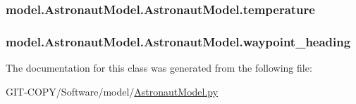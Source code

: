 \subsubsection[{temperature}]{\setlength{\rightskip}{0pt plus 5cm}model.\+Astronaut\+Model.\+Astronaut\+Model.\+temperature}\label{classmodel_1_1AstronautModel_1_1AstronautModel_a396e8b794abeaa7215635523cb03dfb7}
\hypertarget{classmodel_1_1AstronautModel_1_1AstronautModel_a11d42f7b1a897c25839765d6c4c550a3}{}
\subsubsection[{waypoint\+\_\+heading}]{\setlength{\rightskip}{0pt plus 5cm}model.\+Astronaut\+Model.\+Astronaut\+Model.\+waypoint\+\_\+heading}\label{classmodel_1_1AstronautModel_1_1AstronautModel_a11d42f7b1a897c25839765d6c4c550a3}


The documentation for this class was generated from the following file\+:\begin{DoxyCompactItemize}
\item 
G\+I\+T-\/\+C\+O\+P\+Y/\+Software/model/\hyperlink{GIT-COPY_2Software_2model_2AstronautModel_8py}{Astronaut\+Model.\+py}\end{DoxyCompactItemize}
